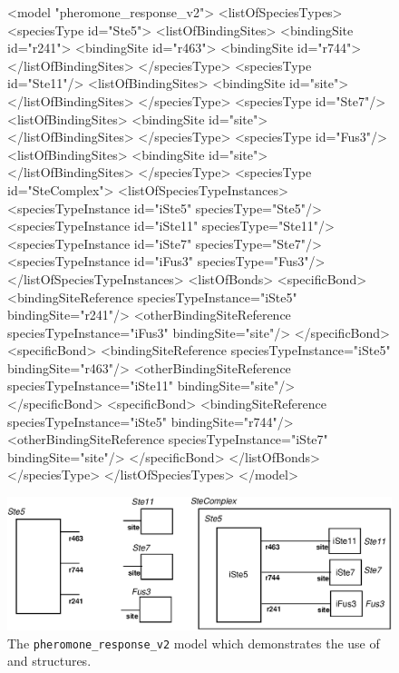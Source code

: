 \documentclass{cekarticle}
\begin{document}
\begin{figure}[h]
\begin{example}
<model "pheromone_response_v2">
    <listOfSpeciesTypes>
        <speciesType id="Ste5">
            <listOfBindingSites>
                <bindingSite id="r241">
                <bindingSite id="r463">
                <bindingSite id="r744">
            </listOfBindingSites>
        </speciesType>
        <speciesType id="Ste11"/>
            <listOfBindingSites>
                <bindingSite id="site">
            </listOfBindingSites>
        </speciesType>
        <speciesType id="Ste7"/>
            <listOfBindingSites>
                <bindingSite id="site">
            </listOfBindingSites>
        </speciesType>
        <speciesType id="Fus3"/>
            <listOfBindingSites>
                <bindingSite id="site">
            </listOfBindingSites>
        </speciesType>
        <speciesType id="SteComplex">
            <listOfSpeciesTypeInstances>
                <speciesTypeInstance id="iSte5" speciesType="Ste5"/>
                <speciesTypeInstance id="iSte11" speciesType="Ste11"/>
                <speciesTypeInstance id="iSte7" speciesType="Ste7"/>
                <speciesTypeInstance id="iFus3" speciesType="Fus3"/>
            </listOfSpeciesTypeInstances>
            <listOfBonds>
                <specificBond>
                    <bindingSiteReference speciesTypeInstance="iSte5" bindingSite="r241"/>
                    <otherBindingSiteReference
                        speciesTypeInstance="iFus3" bindingSite="site"/>
                </specificBond>
                <specificBond>
                    <bindingSiteReference speciesTypeInstance="iSte5" bindingSite="r463"/>
                    <otherBindingSiteReference
                        speciesTypeInstance="iSte11" bindingSite="site"/>
                </specificBond>
                <specificBond>
                    <bindingSiteReference speciesTypeInstance="iSte5" bindingSite="r744"/>
                    <otherBindingSiteReference
                        speciesTypeInstance="iSte7" bindingSite="site"/>
                </specificBond>
            </listOfBonds>
        </speciesType>
    </listOfSpeciesTypes>
</model>
\end{example}
  \vspace*{8pt}
  \centering
  \includegraphics[scale = 0.7]{pheromone_response_v2.eps}
  \caption{The
  \texttt{pheromone\_response\_v2}
  model which demonstrates the use of  and  structures.}
  \label{fig:pheromone_response_v2}
\end{figure}
\end{document}
